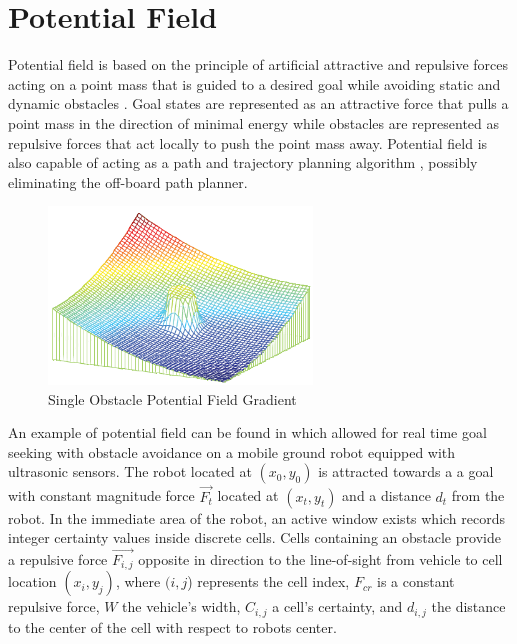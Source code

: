 \documentclass[numbered,pdftex]{ohio-etd}
\begin{document}
\section{Potential Field}


Potential field is based on the principle of artificial attractive and repulsive forces acting on a point mass that is guided to a desired goal while avoiding static and dynamic obstacles \cite{khatib_real-time_1986}. Goal states are represented as an attractive force that pulls a point mass in the direction of minimal energy while obstacles are represented as repulsive forces that act locally to push the point mass away. Potential field is also capable of acting as a path and trajectory planning algorithm \cite{rimon_exact_1992}, possibly eliminating the off-board path planner. 

\begin{figure}[H]
	\centering
	\includegraphics[width=7cm]{PaperFigures/pfObstacle}
	\caption{Single Obstacle Potential Field Gradient \cite{liu_virtual-waypoint_2016}}
	\label{fig:pfobstacle}
\end{figure}


An example of potential field can be found in \cite{borenstein_real-time_1990,borenstein_vector_1991,koren_potential_1991} which allowed for real time goal seeking with obstacle avoidance on a mobile ground robot equipped with ultrasonic sensors. The robot located at $(x_0,y_0)$ is attracted towards a a goal with constant magnitude force $\overrightarrow{F_t}$ located at $(x_t,y_t)$ and a distance $d_t$ from the robot. In the immediate area of the robot, an active window exists which records integer certainty values inside discrete cells. Cells containing an obstacle provide a repulsive force $\overrightarrow{F_{i,j}}$ opposite in direction to the line-of-sight from vehicle to cell location $(x_i,y_j)$, where $(i,j$) represents the cell index, $F_{cr}$ is a constant repulsive force, $W$ the vehicle's width, $C_{i,j}$ a cell's certainty, and $d_{i,j}$ the distance to the center of the cell with respect to robots center.
\end{document}
